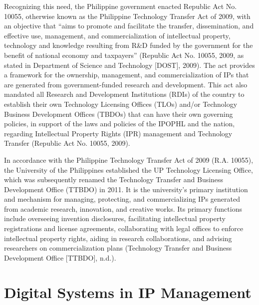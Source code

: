 Recognizing this need, the Philippine government enacted Republic Act No. 10055, otherwise known as the Philippine Technology Transfer Act of 2009, with an objective that ``aims to promote and facilitate the transfer, dissemination, and effective use, management, and commercialization of intellectual property, technology and knowledge resulting from R\&D funded by the government for the benefit of national economy and taxpayers'' (Republic Act No. 10055, 2009, as stated in Department of Science and Technology [DOST], 2009). The act provides a framework for the ownership, management, and commercialization of IPs that are generated from government-funded research and development. This act also mandated all Research and Development Institutions (RDIs) of the country to establish their own Technology Licensing Offices (TLOs) and/or Technology Business Development Offices (TBDOs) that can have their own governing policies, in support of the laws and policies of the IPOPHL and the nation, regarding Intellectual Property Rights (IPR) management and Technology Transfer (Republic Act No. 10055, 2009).

In accordance with the Philippine Technology Transfer Act of 2009 (R.A. 10055), the University of the Philippines established the UP Technology Licensing Office, which was subsequently renamed the Technology Transfer and Business Development Office (TTBDO) in 2011. It is the university’s primary institution and mechanism for managing, protecting, and commercializing IPs generated from academic research, innovation, and creative works. Its primary functions include overseeing invention disclosures, facilitating intellectual property registrations and license agreements, collaborating with legal offices to enforce intellectual property rights, aiding in research collaborations, and advising researchers on commercialization plans (Technology Transfer and Business Development Office [TTBDO], n.d.).

\section{Digital Systems in IP Management}

